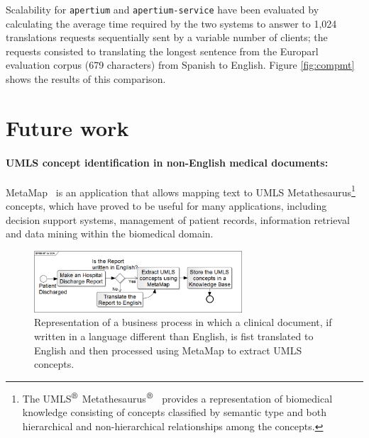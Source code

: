 \documentclass[11pt]{article}
\begin{document}
Scalability for {\tt\small apertium} and {\tt\small apertium-service} have been evaluated by calculating the average time required by the two systems to answer to 1,024 translations requests sequentially sent by a variable number of clients; the requests consisted to translating the longest sentence from the Europarl evaluation corpus (679 characters) from Spanish to English. Figure \ref{fig:compmt} shows the results of this comparison.



\section{Future work}


\paragraph{UMLS concept identification in non-English medical documents:} MetaMap~\citep{metamap} is an application that allows mapping text to UMLS Metathesaurus\footnote{The UMLS$^{\mbox{\small\textregistered}}$ Metathesaurus$^{\mbox{\small\textregistered}}$~\citep{umls} provides a representation of biomedical knowledge consisting of concepts classified by semantic type and both hierarchical and non-hierarchical relationships among the concepts.} concepts, which have proved to be useful for many applications, including decision support systems, management of patient records, information retrieval and data mining within the biomedical domain.

\begin{figure}[!ht]
\begin{center}
\includegraphics[width=7.75cm]{mtsoa}
\end{center}
\caption{Representation of a business process in which a clinical document, if written in a language different than English, is fist translated to English and then processed using MetaMap to extract UMLS concepts.}
\label{fig:mtsoa}
\end{figure}
\end{document}
